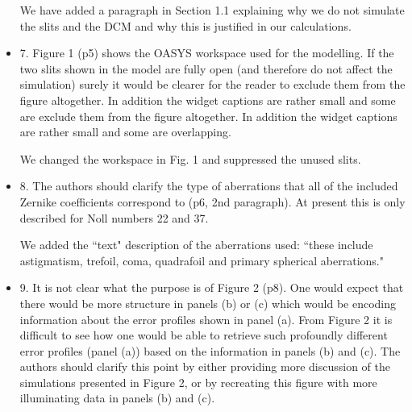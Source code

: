 \documentclass[11pt]{letter} %
\newcommand{\inred}[1]{{\color{red}#1}}
\begin{document}
\begin{letter}{}
\begin{itemize}
    \inred{
    We have added a paragraph in Section 1.1 explaining why we do not simulate the slits and the DCM and why this is justified in our calculations.  
    }
    

    \item 7. Figure 1 (p5) shows the OASYS workspace used for the modelling. If the two slits shown in the model are fully open (and therefore do not affect the simulation) surely it would be clearer for the reader to exclude them from the figure altogether. In addition the widget captions are rather small and some are exclude them from the figure altogether. In addition the widget captions are rather small and some are overlapping.
    
    \inred{We changed the workspace in Fig. 1 and suppressed the unused slits.}
    

    \item 8. The authors should clarify the type of aberrations that all of the included Zernike coefficients correspond to (p6, 2nd paragraph). At present this is only described for Noll numbers 22 and 37.
    
    \inred{We added the ``text" description of the aberrations used: ``these include astigmatism, trefoil, coma, quadrafoil and primary spherical aberrations."}
    

    \item 9. It is not clear what the purpose is of Figure 2 (p8). One would expect that there would be more structure in panels (b) or (c) which would be encoding information about the error profiles shown in panel (a). From Figure 2 it is difficult to see how one would be able to retrieve such profoundly different error profiles (panel (a)) based on the information in panels (b) and (c). The authors should clarify this point by either providing more discussion of the simulations presented in Figure 2, or by recreating this figure with more illuminating data in panels (b) and (c).
    

\end{itemize}
\end{letter}
\end{document}
